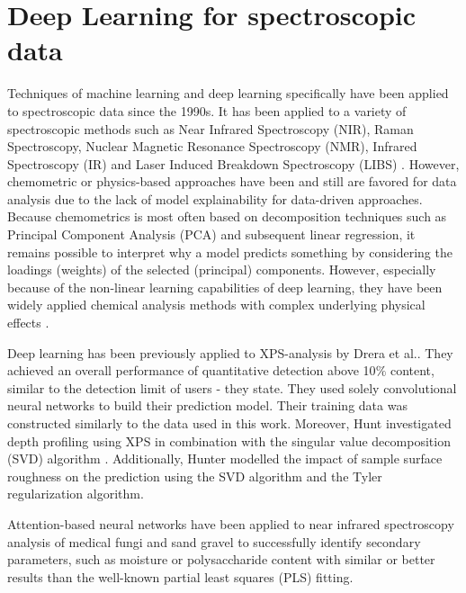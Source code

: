 \label{DL_theory}
\section{Deep Learning for spectroscopic data}

Techniques of machine learning and deep learning specifically have been applied to spectroscopic data since the 1990s. It has been applied to a variety of spectroscopic methods such as Near Infrared Spectroscopy (NIR), Raman Spectroscopy, Nuclear Magnetic Resonance Spectroscopy (NMR), Infrared Spectroscopy (IR) and Laser Induced Breakdown Spectroscopy (LIBS) \cite{krohling_1d_2023, sun_cnnlstm_2023, ma_conditional_2022, zhang_deep_2023, castorena_deep_2021, ghosh_deep_2019, huang_attention_2019}. However, chemometric or physics-based approaches have been and still are favored for data analysis due to the lack of model explainability for data-driven approaches. Because chemometrics is most often based on decomposition techniques such as Principal Component Analysis (PCA) and subsequent linear regression, it remains possible to interpret why a model predicts something by considering the loadings (weights) of the selected (principal) components. However, especially because of the non-linear learning capabilities of deep learning, they have been widely applied chemical analysis methods with complex underlying physical effects \cite{aires-de-sousa_prediction_2002}.

Deep learning has been previously applied to XPS-analysis by Drera et al.\cite{drera_deep_2019}. They achieved an overall performance of quantitative detection above 10$\%$ content, similar to the detection limit of users - they state. They used solely convolutional neural networks to build their prediction model. Their training data was constructed similarly to the data used in this work. Moreover, Hunt investigated depth profiling using XPS in combination with the singular value decomposition (SVD) algorithm \cite{hunt_depth_2000}. Additionally, Hunter modelled the impact of sample surface roughness on the prediction using the SVD algorithm and the Tyler regularization algorithm.

Attention-based neural networks have been applied to near infrared spectroscopy analysis of medical fungi \cite{huang_attention_2019} and sand gravel \cite{yuan_hybrid_2022} to successfully identify secondary parameters, such as moisture or polysaccharide content with similar or better results than the well-known partial least squares (PLS) fitting.

